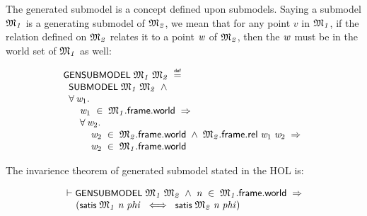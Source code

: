 \documentclass[letterpaper]{article}
\renewcommand{\HOLConst}[1]{{\textsf{\upshape\small #1}}}
\renewcommand{\HOLinline}[1]{\ensuremath{#1}}
\newenvironment{holmath}{\begin{displaymath}\begin{array}{l}}{\end{array}\end{displaymath}\ignorespacesafterend}
\begin{document}
The generated submodel is a concept defined upon submodels. Saying a submodel \HOLinline{\HOLFreeVar{\ensuremath{\mathfrak{M}\sb{1}}}} is a generating submodel of \HOLinline{\HOLFreeVar{\ensuremath{\mathfrak{M}\sb{2}}}}, we mean that for any point $v$ in \HOLinline{\HOLFreeVar{\ensuremath{\mathfrak{M}\sb{1}}}}, if the relation defined on \HOLinline{\HOLFreeVar{\ensuremath{\mathfrak{M}\sb{2}}}} relates it to a point \HOLinline{\HOLFreeVar{w}} of \HOLinline{\HOLFreeVar{\ensuremath{\mathfrak{M}\sb{2}}}}, then the \HOLinline{\HOLFreeVar{w}} must be in the world set of \HOLinline{\HOLFreeVar{\ensuremath{\mathfrak{M}\sb{1}}}} as well:

\begin{holmath}
  \HOLConst{GENSUBMODEL}\;\HOLFreeVar{\ensuremath{\mathfrak{M}\sb{1}}}\;\HOLFreeVar{\ensuremath{\mathfrak{M}\sb{2}}}\;\HOLSymConst{\HOLTokenDefEquality{}}\\
\;\;\HOLConst{SUBMODEL}\;\HOLFreeVar{\ensuremath{\mathfrak{M}\sb{1}}}\;\HOLFreeVar{\ensuremath{\mathfrak{M}\sb{2}}}\;\HOLSymConst{\HOLTokenConj{}}\\
\;\;\HOLSymConst{\HOLTokenForall{}}\HOLBoundVar{w\sb{\mathrm{1}}}.\\
\;\;\;\;\;\;\HOLBoundVar{w\sb{\mathrm{1}}}\;\HOLSymConst{\HOLTokenIn{}}\;\HOLFreeVar{\ensuremath{\mathfrak{M}\sb{1}}}.\HOLFieldName{frame}.\HOLFieldName{world}\;\HOLSymConst{\HOLTokenImp{}}\\
\;\;\;\;\;\;\HOLSymConst{\HOLTokenForall{}}\HOLBoundVar{w\sb{\mathrm{2}}}.\\
\;\;\;\;\;\;\;\;\;\;\HOLBoundVar{w\sb{\mathrm{2}}}\;\HOLSymConst{\HOLTokenIn{}}\;\HOLFreeVar{\ensuremath{\mathfrak{M}\sb{2}}}.\HOLFieldName{frame}.\HOLFieldName{world}\;\HOLSymConst{\HOLTokenConj{}}\;\HOLFreeVar{\ensuremath{\mathfrak{M}\sb{2}}}.\HOLFieldName{frame}.\HOLFieldName{rel}\;\HOLBoundVar{w\sb{\mathrm{1}}}\;\HOLBoundVar{w\sb{\mathrm{2}}}\;\HOLSymConst{\HOLTokenImp{}}\\
\;\;\;\;\;\;\;\;\;\;\HOLBoundVar{w\sb{\mathrm{2}}}\;\HOLSymConst{\HOLTokenIn{}}\;\HOLFreeVar{\ensuremath{\mathfrak{M}\sb{1}}}.\HOLFieldName{frame}.\HOLFieldName{world}
\end{holmath}

The invarience theorem of generated submodel stated in the HOL is:

\begin{holmath}
  \ensuremath{\HOLTokenTurnstile}\HOLConst{GENSUBMODEL}\;\HOLFreeVar{\ensuremath{\mathfrak{M}\sb{1}}}\;\HOLFreeVar{\ensuremath{\mathfrak{M}\sb{2}}}\;\HOLSymConst{\HOLTokenConj{}}\;\HOLFreeVar{n}\;\HOLSymConst{\HOLTokenIn{}}\;\HOLFreeVar{\ensuremath{\mathfrak{M}\sb{1}}}.\HOLFieldName{frame}.\HOLFieldName{world}\;\HOLSymConst{\HOLTokenImp{}}\\
\;\;\;\;\;(\HOLConst{satis}\;\HOLFreeVar{\ensuremath{\mathfrak{M}\sb{1}}}\;\HOLFreeVar{n}\;\HOLFreeVar{phi}\;\HOLSymConst{\HOLTokenEquiv{}}\;\HOLConst{satis}\;\HOLFreeVar{\ensuremath{\mathfrak{M}\sb{2}}}\;\HOLFreeVar{n}\;\HOLFreeVar{phi})
\end{holmath}
\end{document}
